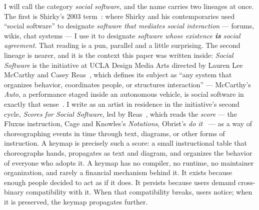 \documentclass[10pt,letterpaper,twocolumn]{article}
\begin{document}
I will call the category \emph{social software}, and the name carries two lineages at once. The first is Shirky's 2003 term~\citep{shirky2003etech,allen2004socialsoftware}: where Shirky and his contemporaries used ``social software'' to designate \emph{software that mediates social interaction} --- forums, wikis, chat systems --- I use it to designate \emph{software whose existence \textbf{is} social agreement}. That reading is a pun, parallel and a little surprising. The second lineage is nearer, and it is the context this paper was written inside: \emph{Social Software} is the initiative at UCLA Design\,\textbar\,Media Arts directed by Lauren Lee McCarthy and Casey Reas~\citep{sosoft_info}, which defines its subject as ``any system that organizes behavior, coordinates people, or structures interaction'' --- McCarthy's \emph{Auto}, a performance staged inside an autonomous vehicle, is social software in exactly that sense~\citep{mccarthy2026auto}. I write as an artist in residence in the initiative's second cycle, \emph{Scores for Social Software}, led by Reas~\citep{reas2026scores}, which reads the \emph{score} --- the Fluxus instruction, Cage and Knowles's \emph{Notations}, Obrist's \emph{do it}~\citep{cage1969notations,obrist1997doit} --- as a way of choreographing events in time through text, diagrams, or other forms of instruction. A keymap is precisely such a score: a small instructional table that choreographs hands, propagates as text and diagram, and organizes the behavior of everyone who adopts it. A keymap has no compiler, no runtime, no maintainer organization, and rarely a financial mechanism behind it. It exists because enough people decided to act as if it does. It persists because users demand cross-binary compatibility with it. When that compatibility breaks, users notice; when it is preserved, the keymap propagates further.
\end{document}
